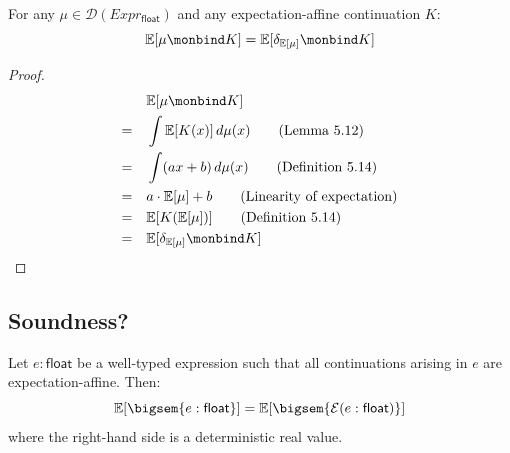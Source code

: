 \begin{lemma}
  For any $\mu \in \mathcal{D}(Expr_\mathsf{float})$ and any expectation-affine continuation $K$:
  \[
    \mathbb{E}[\mu \monbind K] = \mathbb{E}[\delta_{\mathbb{E}[\mu]} \monbind K]
  \]
\end{lemma}

\begin{proof}
  \begin{align*}
    &\mathbb{E}[\mu \monbind K] \\
    = \quad&\int \mathbb{E}[K(x)] \, d\mu(x) \tag{Lemma 5.12} \\
    = \quad&\int (ax + b) \, d\mu(x) \tag{Definition 5.14} \\
    = \quad&a \cdot \mathbb{E}[\mu] + b \tag{Linearity of expectation} \\
    = \quad&\mathbb{E}[K(\mathbb{E}[\mu])] \tag{Definition 5.14} \\
    = \quad&\mathbb{E}[\delta_{\mathbb{E}[\mu]} \monbind K] 
  \end{align*}
\end{proof}

\subsection{Soundness?}

\begin{theorem}
  Let $e : \mathsf{float}$ be a well-typed expression such that all continuations arising in $e$ are expectation-affine. Then:
  \[
    \mathbb{E}[\bigsem{e : \mathsf{float}}] = \mathbb{E}[\bigsem{\mathcal{E}( e : \mathsf{float})}]
  \]
  where the right-hand side is a deterministic real value.
\end{theorem}



